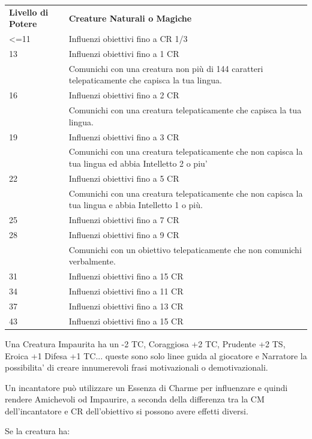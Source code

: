 \documentclass[a4paper,11pt,twoside,openany]{book}
\begin{document}
\begin{tabularx}{\textwidth}{lX}
	\toprule
	\textbf{Livello di Potere} & \textbf{Creature Naturali o Magiche}\tabularnewline
	<=11  & Influenzi obiettivi fino a CR 1/3\\
	13    & Influenzi obiettivi fino a 1 CR  \\
	      & Comunichi con una creatura non più di 144 caratteri telepaticamente che capisca la tua lingua. \\
	16    & Influenzi obiettivi fino a 2  CR\\
          & Comunichi con una creatura telepaticamente che capisca la tua lingua.\\
	19    & Influenzi obiettivi fino a 3 CR  \\
          & Comunichi con una creatura telepaticamente che non capisca la tua lingua ed abbia Intelletto 2 o piu' \\
	22    & Influenzi obiettivi fino a 5 CR \\
	      & Comunichi con una creatura telepaticamente che non capisca la tua lingua e abbia Intelletto 1 o più.  \\
	25    & Influenzi obiettivi fino a 7 CR \\
	28    & Influenzi obiettivi fino a 9 CR \\
	      & Comunichi con un obiettivo telepaticamente che non comunichi verbalmente. \\
	31    & Influenzi obiettivi fino a 15 CR \\
	34    & Influenzi obiettivi fino a 11 CR \\
	37    & Influenzi obiettivi fino a 13 CR \\
	43    & Influenzi obiettivi fino a 15 CR \\
\end{tabularx}

Una Creatura Impaurita ha un -2 TC, Coraggiosa +2 TC, Prudente +2 TS, Eroica +1 Difesa +1 TC... queste sono solo linee guida al giocatore e Narratore la possibilita' di creare innumerevoli frasi motivazionali o demotivazionali.

\medskip

Un incantatore può utilizzare un Essenza di Charme per influenzare e quindi rendere Amichevoli od Impaurire, a seconda della differenza tra la CM dell'incantatore e CR dell'obiettivo si possono avere effetti diversi.

\medskip

Se la creatura ha:
\end{document}
